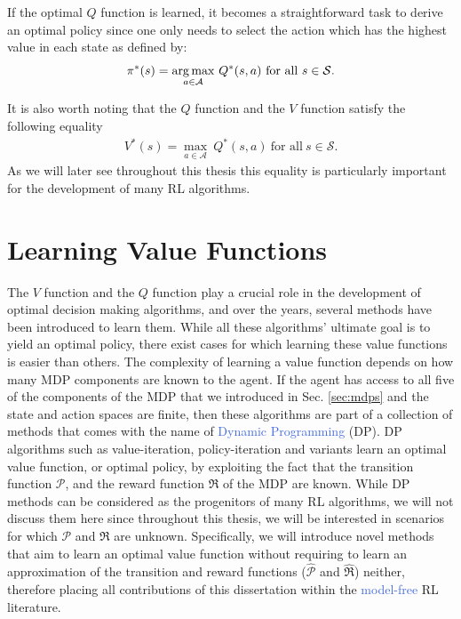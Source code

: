 If the optimal $Q$ function is learned, it becomes a straightforward task to derive an optimal policy since one only needs to select the action which has the highest value in each state as defined by:
\begin{equation}
	\pi^{*}(s) = \underset{a\in\mathcal{A}}{\operatorname*{arg\,max}} \ Q^{*}(s,a) \ \text{for all} \ s \in \mathcal{S}.
\end{equation}

It is also worth noting that the $Q$ function and the $V$ function satisfy the following equality
\begin{align}
	V^{*}(s) = \underset{a\in\mathcal{A}}{\max} \ Q^{*}(s,a) \ \text{for all} \ s \in \mathcal{S}.
\end{align}
As we will later see throughout this thesis this equality is particularly important for the development of many RL algorithms.


\section{Learning Value Functions}
\label{sec:learning_value_functions}
The $V$ function and the $Q$ function play a crucial role in the development of optimal decision making algorithms, and over the years, several methods have been introduced to learn them. While all these algorithms' ultimate goal is to yield an optimal policy, there exist cases for which learning these value functions is easier than others. The complexity of learning a value function depends on how many MDP components are known to the agent. If the agent has access to all five of the components of the MDP that we introduced in Sec. \ref{sec:mdps} and the state and action spaces are finite, then these algorithms are part of a collection of methods that comes with the name of \textcolor{RoyalBlue}{Dynamic Programming} (DP). DP algorithms such as value-iteration, policy-iteration and variants \cite{bertsekas2015value,wei2015value} learn an optimal value function, or optimal policy, by exploiting the fact that the transition function $\mathcal{P}$, and the reward function $\Re$ of the MDP are known. While DP methods can be considered as the progenitors of many RL algorithms, we will not discuss them here since throughout this thesis, we will be interested in scenarios for which $\mathcal{P}$ and $\Re$ are unknown. Specifically, we will introduce novel methods that aim to learn an optimal value function without requiring to learn an approximation of the transition and reward functions ($\widehat{\mathcal{P}}$ and $\widehat{\mathcal{\Re}}$) neither, therefore placing all contributions of this dissertation within the \textcolor{RoyalBlue}{model-free} RL literature. 

